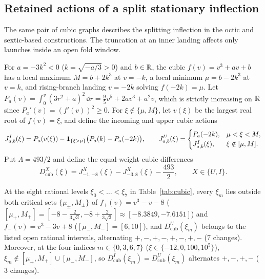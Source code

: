 \subsection{Retained actions of a split stationary inflection}\label{subsec:cubic}
The same pair of cubic graphs describes the splitting inflection in the octic and sextic-based constructions. The truncation at an inner landing affects only launches inside an open fold window.

For $a=-3k^2<0$ ($k=\sqrt{-a/3}>0$) and $b\in\mathbb{R}$, the cubic $f(v)=v^3+av+b$ has a local maximum $M=b+2k^3$ at $v=-k$, a local minimum $\mu=b-2k^3$ at $v=k$, and rising-branch landing $v=-2k$ solving $f(-2k)=\mu$. Let $P_a(v)=\int_0^v (3r^2+a)^2\,\dd r=\tfrac95 v^5+2av^3+a^2v$, which is strictly increasing on $\mathbb{R}$ since $P_a'(v)=(f'(v))^2\ge 0$. For $\xi\notin\{\mu,M\}$, let $v(\xi)$ be the largest real root of $f(v)=\xi$, and define the incoming and upper cubic actions
\begin{equation}\label{eq:cubic-actions}
  J_{a,b}^I(\xi) = P_a(v(\xi)) - \mathbf{1}_{\{\xi>\mu\}}\big(P_a(k)-P_a(-2k)\big),\qquad
  J_{a,b}^U(\xi) = \begin{cases}
    P_a(-2k), & \mu<\xi<M,\\
    J_{a,b}^I(\xi), & \xi\notin[\mu,M].
  \end{cases}
\end{equation}
Put $\Lambda=493/2$ and define the equal-weight cubic differences
\begin{equation}\label{eq:D-cub}
  D_{\mathrm{cub}}^X(\xi) = J_{-1,-8}^X(\xi) - J_{-3,8}^X(\xi) - \frac{493}{2},\qquad X\in\{U,I\}.
\end{equation}

\begin{lemma}\label{lem:cubic-table}
At the eight rational levels $\xi_0<\dots<\xi_7$ in Table~\ref{tab:cubic}, every $\xi_m$ lies outside both critical sets $\{\mu_\pm,M_\pm\}$ of $f_+(v)=v^3-v-8$ ($[\mu_+,M_+]=[-8-\tfrac{2}{3\sqrt3},-8+\tfrac{2}{3\sqrt3}]\approx[-8.3849,-7.6151]$) and $f_-(v)=v^3-3v+8$ ($[\mu_-,M_-]=[6,10]$), and $D_{\mathrm{cub}}^U(\xi_m)$ belongs to the listed open rational intervals, alternating $+,-,+,-,+,-,+,-$ ($7$ changes). Moreover, at the four indices $m\in\{0,3,6,7\}$ ($\xi\in\{-12,0,100,10^5\}$), $\xi_m\notin[\mu_+,M_+]\cup[\mu_-,M_-]$, so $D_{\mathrm{cub}}^I(\xi_m)=D_{\mathrm{cub}}^U(\xi_m)$ alternates $+,-,+,-$ ($3$ changes).
\end{lemma}



